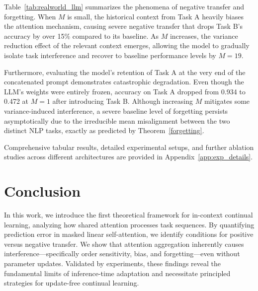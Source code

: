 \documentclass{article}
\theoremstyle{plain}
\theoremstyle{definition}
\theoremstyle{remark}
\begin{document}
\begin{table}[h]
\centering
\caption{ICCL Evaluation on Qwen2.5-1.5B-Instruct.}
\label{tab:realworld_llm}
\end{table}

Table~\ref{tab:realworld_llm} summarizes the phenomena of negative transfer and forgetting. When $M$ is small, the historical context from Task A heavily biases the attention mechanism, causing severe negative transfer that drops Task B's accuracy by over 15\% compared to its baseline. As $M$ increases, the variance reduction effect of the relevant context emerges, allowing the model to gradually isolate task interference and recover to baseline performance levels by $M=19$.

Furthermore, evaluating the model's retention of Task A at the very end of the concatenated prompt demonstrates catastrophic degradation. Even though the LLM's weights were entirely frozen, accuracy on Task A dropped from 0.934 to 0.472 at $M=1$ after introducing Task B. Although increasing $M$ mitigates some variance-induced interference, a severe baseline level of forgetting persists asymptotically due to the irreducible mean misalignment between the two distinct NLP tasks, exactly as predicted by Theorem~\ref{forgetting}. 

Comprehensive tabular results, detailed experimental setups, and further ablation studies across different architectures are provided in Appendix~\ref{app:exp_details}.

\vspace{-0.1in}\section{Conclusion}
In this work, we introduce the first theoretical framework for in-context continual learning, analyzing how shared attention processes task sequences. By quantifying prediction error in masked linear self-attention, we identify conditions for positive versus negative transfer. We show that attention aggregation inherently causes interference—specifically order sensitivity, bias, and forgetting—even without parameter updates. Validated by experiments, these findings reveal the fundamental limits of inference-time adaptation and necessitate principled strategies for update-free continual learning.
\end{document}
